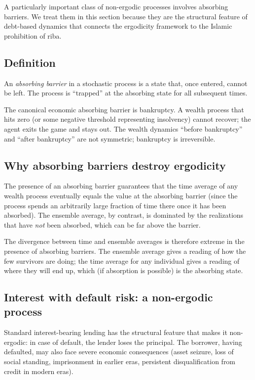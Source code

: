 A particularly important class of non-ergodic processes involves
absorbing barriers. We treat them in this section because they are
the structural feature of debt-based dynamics that connects the
ergodicity framework to the Islamic prohibition of riba.

\subsection{Definition}

\begin{definition}
\label{def:absorbing}
An \emph{absorbing barrier} in a stochastic process is a state that,
once entered, cannot be left. The process is ``trapped'' at the
absorbing state for all subsequent times.
\end{definition}

The canonical economic absorbing barrier is bankruptcy. A wealth
process that hits zero (or some negative threshold representing
insolvency) cannot recover; the agent exits the game and stays out.
The wealth dynamics ``before bankruptcy'' and ``after bankruptcy''
are not symmetric; bankruptcy is irreversible.

\subsection{Why absorbing barriers destroy ergodicity}

The presence of an absorbing barrier guarantees that the time
average of any wealth process eventually equals the value at the
absorbing barrier (since the process spends an arbitrarily large
fraction of time there once it has been absorbed). The ensemble
average, by contrast, is dominated by the realizations that have
\emph{not} been absorbed, which can be far above the barrier.

The divergence between time and ensemble averages is therefore
extreme in the presence of absorbing barriers. The ensemble average
gives a reading of how the few survivors are doing; the time
average for any individual gives a reading of where they will end
up, which (if absorption is possible) is the absorbing state.

\subsection{Interest with default risk: a non-ergodic process}

Standard interest-bearing lending has the structural feature that
makes it non-ergodic: in case of default, the lender loses the
principal. The borrower, having defaulted, may also face severe
economic consequences (asset seizure, loss of social standing,
imprisonment in earlier eras, persistent disqualification from
credit in modern eras).


